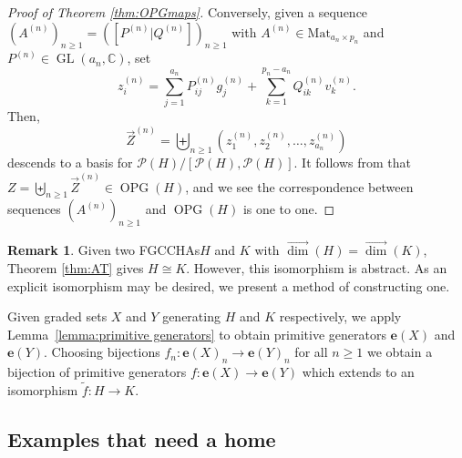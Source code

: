 \documentclass[11pt]{amsart}
\theoremstyle{definition}
\newtheorem{remark}[theorem]{Remark}
\numberwithin{equation}{section}
\def\CC{{\mathbb C}}
\DeclareMathOperator{\GL}{GL}
\newcommand{\FGCCHAs}{\textsf{FGCCHA}s\xspace}
\newcommand{\vecdim}{\overrightarrow{\dim}}
\newcommand{\OPG}{\operatorname{OPG}}
\begin{document}
\begin{proof}[Proof of Theorem \ref{thm:OPGmaps}]
    Conversely, given a sequence $\left(A^{(n)}\right)_{n \geq 1} = \left([P^{(n)}|Q^{(n)}]\right)_{n \geq 1}$ with $A^{(n)} \in \textrm{Mat}_{a_n \times p_n}$ and $P^{(n)} \in \GL(a_n,\CC)$, set
    \[
        z_i^{(n)} = \sum_{j = 1}^{a_n}P_{ij}^{(n)}g_{j}^{(n)} + \sum_{k = 1}^{p_n - a_n}Q_{ik}^{(n)}v_k^{(n)}.
    \]
    Then,
    \[
        \vec{Z}^{(n)} = \biguplus_{n\geq 1} \left(z_1^{(n)},z_2^{(n)},\ldots,z_{a_n}^{(n)}\right)
    \]
    descends to a basis for $\mathcal{P}(H)/[\mathcal{P}(H),\mathcal{P}(H)]$.
    It follows from \cite[Corollary 2.6]{F23}
     that $Z = \biguplus_{n \geq 1} \vec{Z}^{(n)} \in \OPG(H)$,
     and we see the correspondence between sequences
     $\left(A^{(n)}\right)_{n \geq 1}$ and $\OPG(H)$ is one to one.
\end{proof}


\begin{remark}
    Given two \FGCCHAs $H$ and $K$ with $\vecdim(H) = \vecdim(K)$, Theorem \ref{thm:AT} gives $H \cong K$. However, this isomorphism is abstract. As an explicit isomorphism may be desired, we present a method of constructing one. 
    
    Given graded sets $X$ and $Y$ generating $H$ and $K$ respectively, we apply Lemma~\ref{lemma:primitive generators} to obtain primitive generators $\mathbf{e}(X)$ and $\mathbf{e}(Y)$. Choosing bijections $f_n:\mathbf{e}(X)_n \to \mathbf{e}(Y)_n$ for all $n \geq 1$ we obtain a bijection of primitive generators $f:\mathbf{e}(X) \to \mathbf{e}(Y)$ which extends to an isomorphism $\tilde{f}:H \to K$.
\end{remark}

\subsection{Examples that need a home}
\end{document}
